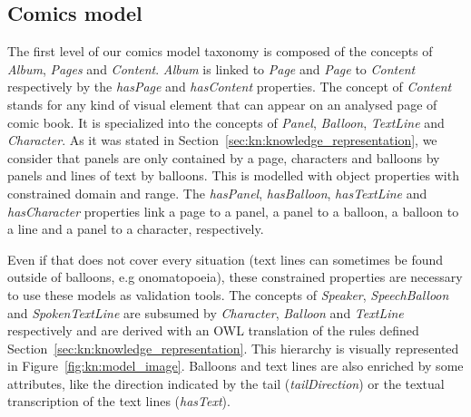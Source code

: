 
\subsection{Comics model}
The first level of our comics model taxonomy is composed of the concepts of \textit{Album}, \textit{Pages} and \textit{Content}.
\textit{Album} is linked to \textit{Page} and \textit{Page} to \textit{Content} respectively by the \textit{hasPage} and \textit{hasContent} properties.
The concept of \textit{Content} stands for any kind of visual element that can appear on an analysed page of comic book.
It is specialized into the concepts of \textit{Panel}, \textit{Balloon}, \textit{TextLine} and \textit{Character}.
As it was stated in Section~\ref{sec:kn:knowledge_representation}, we consider that panels are only contained by a page, characters and balloons by panels and lines of text by balloons.
This is modelled with object properties with constrained domain and range.
The \textit{hasPanel}, \textit{hasBalloon}, \textit{hasTextLine} and \textit{hasCharacter} properties link a page to a panel, a panel to a balloon, a balloon to a line and a panel to a character, respectively.

Even if that does not cover every situation (text lines can sometimes be found outside of balloons, e.g onomatopoeia), these constrained properties are necessary to use these models as validation tools.
The concepts of \textit{Speaker}, \textit{SpeechBalloon} and \textit{SpokenTextLine} are subsumed by \textit{Character}, \textit{Balloon} and \textit{TextLine} respectively and are derived with an OWL translation of the rules defined Section~\ref{sec:kn:knowledge_representation}.
This hierarchy is visually represented in Figure~\ref{fig:kn:model_image}.
Balloons and text lines are also enriched by some attributes, like the direction indicated by the tail (\textit{tailDirection}) or the textual transcription of the text lines (\textit{hasText}).

